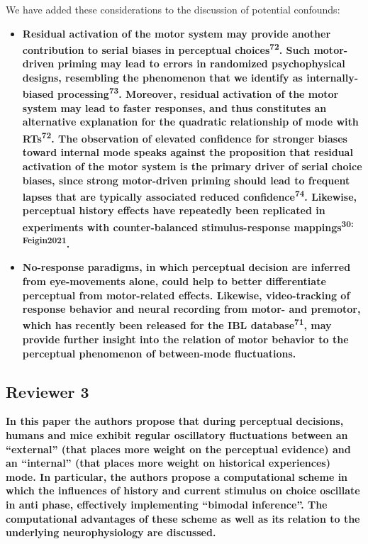\documentclass[
]{article}
\begin{document}
We have added these considerations to the discussion of potential
confounds:

\begin{itemize}
\item
  \textbf{Residual activation of the motor system may provide another
  contribution to serial biases in perceptual
  choices\textsuperscript{72}. Such motor-driven priming may lead to
  errors in randomized psychophysical designs, resembling the phenomenon
  that we identify as internally-biased processing\textsuperscript{73}.
  Moreover, residual activation of the motor system may lead to faster
  responses, and thus constitutes an alternative explanation for the
  quadratic relationship of mode with RTs\textsuperscript{72}. The
  observation of elevated confidence for stronger biases toward internal
  mode speaks against the proposition that residual activation of the
  motor system is the primary driver of serial choice biases, since
  strong motor-driven priming should lead to frequent lapses that are
  typically associated reduced confidence\textsuperscript{74}. Likewise,
  perceptual history effects have repeatedly been replicated in
  experiments with counter-balanced stimulus-response
  mappings\textsuperscript{30: Feigin2021}.}
\item
  \textbf{No-response paradigms, in which perceptual decision are
  inferred from eye-movements alone, could help to better differentiate
  perceptual from motor-related effects. Likewise, video-tracking of
  response behavior and neural recording from motor- and premotor, which
  has recently been released for the IBL database\textsuperscript{71},
  may provide further insight into the relation of motor behavior to the
  perceptual phenomenon of between-mode fluctuations.}
\end{itemize}

\hypertarget{reviewer-3}{%
\subsection{Reviewer 3}\label{reviewer-3}}

\textbf{In this paper the authors propose that during perceptual
decisions, humans and mice exhibit regular oscillatory fluctuations
between an ``external'' (that places more weight on the perceptual
evidence) and an ``internal'' (that places more weight on historical
experiences) mode. In particular, the authors propose a computational
scheme in which the influences of history and current stimulus on choice
oscillate in anti phase, effectively implementing ``bimodal inference''.
The computational advantages of these scheme as well as its relation to
the underlying neurophysiology are discussed.}
\end{document}
